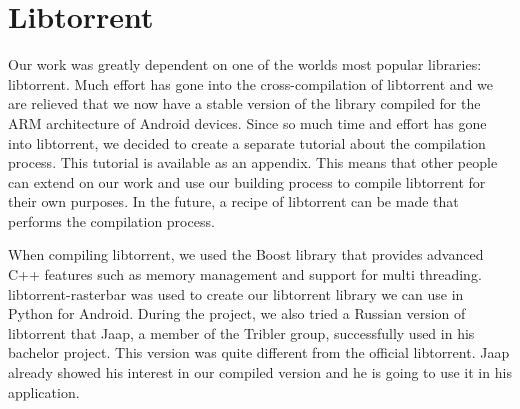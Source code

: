 \section{Libtorrent}
	Our work was greatly dependent on one of the worlds most popular libraries: libtorrent. Much effort has gone into the cross-compilation of libtorrent and we are relieved that we now have a stable version of the library compiled for the ARM architecture of Android devices. Since so much time and effort has gone into libtorrent, we decided to create a separate tutorial about the compilation process. This tutorial is available as an appendix. This means that other people can extend on our work and use our building process to compile libtorrent for their own purposes. In the future, a recipe of libtorrent can be made that performs the compilation process.
	
	When compiling libtorrent, we used the Boost library that provides advanced C++ features such as memory management and support for multi threading. libtorrent-rasterbar was used to create our libtorrent library we can use in Python for Android. During the project, we also tried a Russian version of libtorrent that Jaap, a member of the Tribler group, successfully used in his bachelor project. This version was quite different from the official libtorrent. Jaap already showed his interest in our compiled version and he is going to use it in his application.